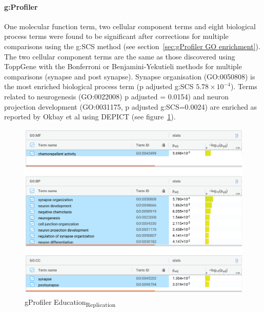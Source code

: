 \paragraph{g:Profiler}

One molecular function term, two cellular component terms and eight biological process terms were found to be significant after corrections for multiple comparisons using the g:SCS method (see section~\ref{sec:gProfiler GO enrichment}). The two cellular component terms are the same as those discovered using ToppGene with the Bonferroni or Benjamini-Yekutieli methods for multiple comparisons (synapse and post synapse). Synapse organisation (GO:0050808) is the most enriched biological process term (p adjusted g:SCS $5.78\times10^{-4}$). Terms related to neurogenesis (GO:0022008) p adjusted = 0.0154) and neuron projection development (GO:0031175, p adjusted g:SCS=0.0024) are enriched as reported by Okbay et al\cite{okbay2016genome} using DEPICT (see figure~\ref{fig:gProfiler EA2}).



\begin{figure}
    \centering
    \includegraphics[width=\textwidth]{images/gprofiler/all_terms/ea2_all_terms.png}
    \caption{gProfiler Education\textsubscript{Replication}}
    \label{fig:gProfiler EA2}
\end{figure}







